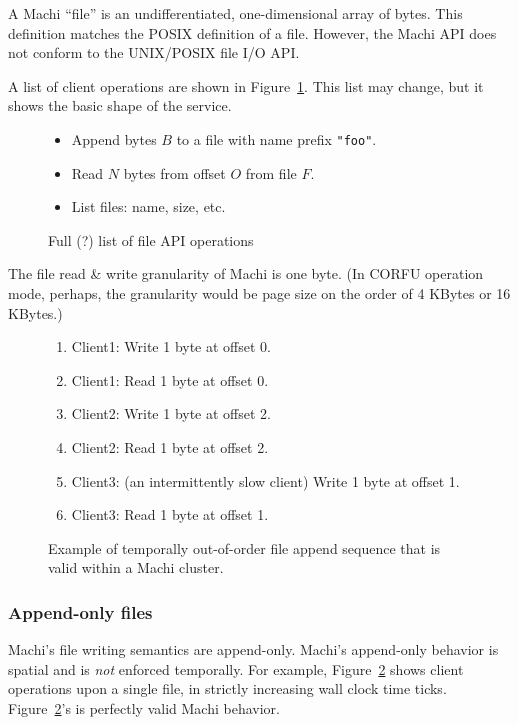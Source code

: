 \documentclass[preprint,10pt]{sigplanconf}
\begin{document}
A Machi ``file'' is an undifferentiated, one-dimensional array of
bytes.  This definition matches the POSIX definition of a file.
However, the Machi API does not conform to the UNIX/POSIX file
I/O API.

A list of client operations are shown in
Figure~\ref{fig:example-client-API}.  This list may change, but it
shows the basic shape of the service.

\begin{figure}
\begin{itemize}
        \item Append bytes $B$ to a file with name prefix {\tt "foo"}.
        \item Read $N$ bytes from offset $O$ from file $F$.
        \item List files: name, size, etc.
\end{itemize}
\caption{Full (?) list of file API operations}
\label{fig:example-client-API}
\end{figure}

The file read \& write granularity of Machi is one byte.  (In CORFU
operation mode, perhaps, the granularity would be page size on the
order of 4 KBytes or 16 KBytes.)

\begin{figure}
    \begin{enumerate}
        \item Client1: Write 1 byte at offset 0.
        \item Client1: Read 1 byte at offset 0.
        \item Client2: Write 1 byte at offset 2.
        \item Client2: Read 1 byte at offset 2.
        \item Client3: (an intermittently slow client) Write 1 byte at offset 1.
        \item Client3: Read 1 byte at offset 1.
    \end{enumerate}
\caption{Example of temporally out-of-order file append sequence that
  is valid within a Machi cluster.}
\label{fig:temporal-out-of-order}
\end{figure}

\subsubsection{Append-only files}
\label{sub:assume-append-only}

Machi's file writing semantics are append-only.  
Machi's append-only behavior is spatial and is {\em not}
enforced temporally.  For example, Figure~\ref{fig:temporal-out-of-order}
shows client operations
upon a single file, in strictly increasing wall clock time ticks.
Figure~\ref{fig:temporal-out-of-order}'s is perfectly valid Machi behavior.
\end{document}
